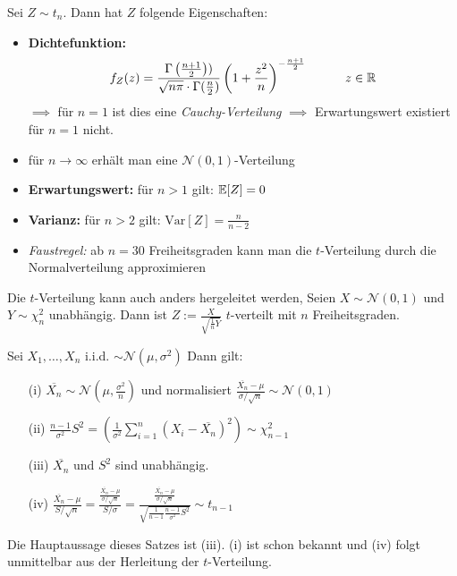 Sei $Z \sim t_n$. Dann hat $Z$ folgende Eigenschaften:
\begin{itemize}
\item \textbf{Dichtefunktion:} $$f_Z(z) = \frac{\Gamma\left( \frac{n+1}{2}\right))}{\sqrt{n\pi} \cdot \Gamma(\frac{n}{2})} \left(1 + \frac{z^2}{n}\right)^{- \frac{n+1}{2}} \quad \quad \quad z \in \mathbb{R}$$
$\implies$ für $n=1$ ist dies eine \textit{Cauchy-Verteilung} $\implies$ Erwartungswert existiert für $n=1$ nicht.
\item für $n\to \infty$ erhält man eine $\mathcal{N}(0,1)$-Verteilung 
\item \textbf{Erwartungswert:} für $n>1$ gilt: $\mathbb{E}[Z] = 0$
\item \textbf{Varianz:} für $n>2$ gilt: $\mathrm{Var}[Z] = \frac{n}{n-2}$
\item \textit{Faustregel:} ab $n=30$ Freiheitsgraden kann man die $t$-Verteilung durch die Normalverteilung approximieren
\end{itemize}
Die $t$-Verteilung kann auch anders hergeleitet werden, Seien $X \sim \mathcal{N}(0,1)$ und $Y \sim \chi_n^2$ unabhängig. Dann ist $Z:= \frac{X}{\sqrt{\frac{1}{n} Y}}$ $t$-verteilt mit $n$ Freiheitsgraden.

\begin{satz} 
Sei $X_1,\dots, X_n$ i.i.d. $\sim \mathcal{N}(\mu,\sigma^2)$ Dann gilt:
\begin{itemize}
\item[(i)] $\overline{X_n} \sim \mathcal{N}\left(\mu, \frac{\sigma^2}{n}\right)$ und normalisiert $\frac{\overline{X_n}-\mu}{\sigma / \sqrt{n}} \sim \mathcal{N}(0,1)$
\item[(ii)] $\frac{n-1}{\sigma^2}S^2 = \left(\frac{1}{\sigma^2} \sum_{i=1}^n (X_i - \overline{X_n})^2 \right) \sim \chi_{n-1}^2$
\item[(iii)] $\overline{X_n}$ und $S^2$ sind unabhängig.
\item[(iv)] $\frac{\overline{X_n}-\mu}{S / \sqrt{n}} = \frac{\frac{\overline{X_n}-\mu}{\sigma / \sqrt{n}}}{S/\sigma} = \frac{\frac{\overline{X_n}-\mu}{\sigma / \sqrt{n}}}{\sqrt{\frac{1}{n-1} \frac{n-1}{\sigma^2} S^2}} \sim t_{n-1}$
\end{itemize}
\end{satz}
Die Hauptaussage dieses Satzes ist (iii). (i) ist schon bekannt und (iv) folgt unmittelbar aus der Herleitung der $t$-Verteilung.


